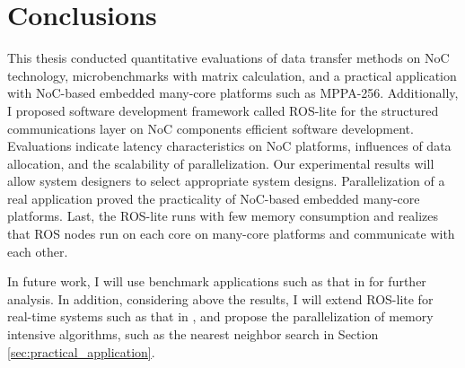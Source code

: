 \chapter{Conclusions}
\label{chap:conclusion}
This thesis conducted quantitative evaluations of data transfer methods on NoC technology, microbenchmarks with matrix calculation, and a practical application with NoC-based embedded many-core platforms such as MPPA-256.
Additionally, I proposed software development framework called ROS-lite for the structured communications layer on NoC components efficient software development.
Evaluations indicate latency characteristics on NoC platforms, influences of data allocation, and the scalability of parallelization.
Our experimental results will allow system designers to select appropriate system designs.
Parallelization of a real application proved the practicality of NoC-based embedded many-core platforms.
Last, the ROS-lite runs with few memory consumption and realizes that ROS nodes run on each core on many-core platforms and communicate with each other.

In future work, I will use benchmark applications such as that in \cite{che2010characterization} for further analysis.
In addition, considering above the results, I will extend ROS-lite for real-time systems such as that in \cite{maruyama2016ros2}, and propose the parallelization of memory intensive algorithms, such as the nearest neighbor search in Section \ref{sec:practical_application}.







% 
% 

% 


